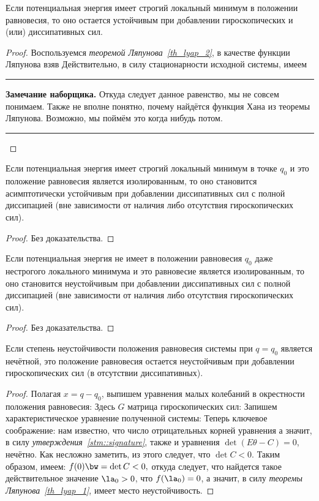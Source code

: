\documentclass[a4paper,12pt]{article}
\newcommand{\tstm}[1]{\emph{#1}}
\newcommand{\spr}[2]{\hr{#1 \cdot #2}}
\newenvironment{nbb}{\par\vskip3pt\hrule\vskip3pt\textbf{\footnotesize Замечание наборщика.}\footnotesize }
{\vskip3pt\hrule\par\vskip3pt}
\begin{document}
\begin{theorem}
\label{gir_diss_stable}
Если потенциальная энергия имеет строгий локальный минимум в положении равновесия, то оно остается
устойчивым при добавлении гироскопических и (или) диссипативных сил.
\end{theorem}
\begin{proof}
Воспользуемся \tstm{теоремой Ляпунова~\ref{th_lyap_2}},
в качестве функции Ляпунова взяв
Действительно, в силу стационарности исходной системы,
имеем
\equ{\dot{W}= \spr{Q_d}{\dot{q}}\le0.}
\begin{nbb}
Откуда следует данное равенство, мы не совсем понимаем. Также не вполне понятно, почему найдётся
функция Хана из теоремы Ляпунова. Возможно, мы поймём это когда нибудь потом.
\end{nbb}
\end{proof}
\begin{theorem}
\label{gir_diss_stable_asymp}
Если потенциальная энергия имеет строгий локальный минимум в точке $q_0$ и это положение равновесия
является изолированным, то оно становится асимптотически устойчивым при добавлении диссипативных
сил с полной диссипацией (вне зависимости от наличия либо отсутствия гироскопических сил).
\end{theorem}
\begin{proof}
Без доказательства.
\end{proof}
\begin{theorem}
\label{gir_unstable}
Если потенциальная энергия не имеет в положении равновесия $q_0$ даже нестрогого локального
минимума и это равновесие является изолированным, то оно становится неустойчивым при добавлении
диссипативных сил с полной диссипацией (вне зависимости от наличия либо отсутствия гироскопических
сил).
\end{theorem}
\begin{proof}
Без доказательства.
\end{proof}
\begin{theorem}
\label{gir_odd}
Если степень неустойчивости положения равновесия системы при ${q=q_0}$ является нечётной, это
положение равновесия остается неустойчивым при добавлении гироскопических сил (в отсутствии
диссипативных).
\end{theorem}
\begin{proof}
Полагая $x=q-q_0$, выпишем уравнения малых колебаний в окрестности положения равновесия:
 Здесь $G$ матрица гироскопических сил:
 Запишем характеристическое уравнение полученной
системы:  Теперь ключевое соображение: нам известно, что число
отрицательных корней уравнения  а значит, в силу \tstm{утверждения~\ref{stm::signature}},
также и уравнения $\det(E\theta-C)=0$, нечётно. Как несложно заметить, из этого
следует, что $\det C<0$. Таким образом, имеем: $f(0)\bw=\det C<0,$ откуда следует, что найдется такое
действительное значение $\la_0>0$, что $f(\la_0)=0$, а значит, в силу \tstm{теоремы Ляпунова~\ref{th_lyap_1}}, имеет место
неустойчивость.
\end{proof}
\end{document}
